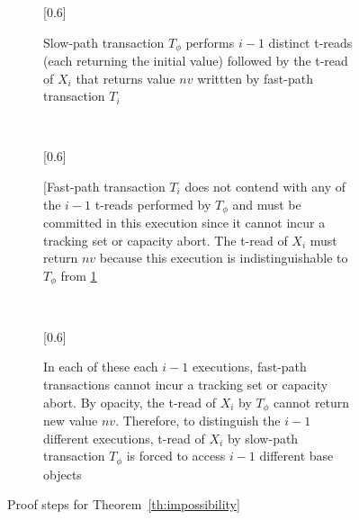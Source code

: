 \begin{figure*}[!t]
\begin{center}
	\begin{subfigure}{\linewidth}{\scalebox{0.6}[0.6]{}}
	\caption{Slow-path transaction $T_{\phi}$ performs $i-1$ distinct t-reads (each returning the initial value) followed by the t-read of $X_i$ that returns value $nv$ 
	writtten by fast-path transaction $T_i$}\label{sfig:inv-1}
	\end{subfigure}
        \\
        \vspace{2mm}
	\begin{subfigure}{\linewidth}{\scalebox{0.6}[0.6]{}}
	\caption{[Fast-path transaction $T_i$ does not contend with any of the $i-1$ t-reads performed by $T_{\phi}$ and must be committed in this execution since it cannot incur a tracking set or capacity abort.
	The t-read of $X_i$ must return $nv$ because this execution is indistinguishable to $T_{\phi}$ from \ref{sfig:inv-1}}
	\label{sfig:inv-2} 
	\end{subfigure}
	\\
	\vspace{2mm}
	\begin{subfigure}{\linewidth}{\scalebox{0.6}[0.6]{}}
	 \caption{In each of these each $i-1$ executions, fast-path transactions cannot incur a tracking set or capacity abort. By opacity, the t-read of $X_i$ by $T_{\phi}$ cannot return new value $nv$.
	Therefore, to distinguish the $i-1$ different executions, t-read of $X_i$ by slow-path transaction $T_{\phi}$ is forced
	to access $i-1$ different base objects}
	\label{sfig:inv-3}
	\end{subfigure}
	\caption{Proof steps for Theorem~\ref{th:impossibility}
        \label{fig:indis}} 
\end{center}
\end{figure*}
